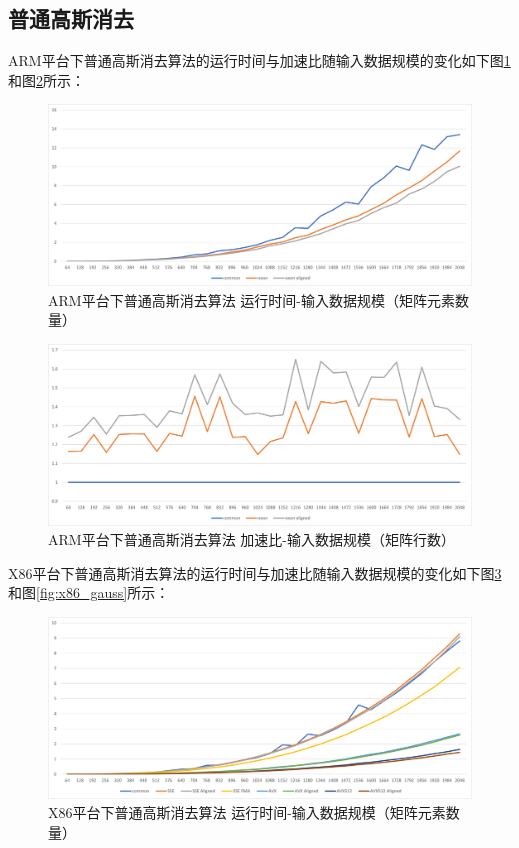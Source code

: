 \documentclass[a4paper]{article}
\begin{document}
\subsection{普通高斯消去}
ARM平台下普通高斯消去算法的运行时间与加速比随输入数据规模的变化如下图\ref{fig:arm_gauss_timing}和图\ref{fig:arm_gauss}所示：
\begin{figure}[H]
    \centering
    \includegraphics[width=6.2in]{fig/arm_gauss_timing.png}
    \caption{ARM平台下普通高斯消去算法 运行时间-输入数据规模（矩阵元素数量）}
    \label{fig:arm_gauss_timing}
\end{figure}

\begin{figure}[H]
    \centering
    \includegraphics[width=6.2in]{fig/arm_gauss.png}
    \caption{ARM平台下普通高斯消去算法 加速比-输入数据规模（矩阵行数）}
    \label{fig:arm_gauss}
\end{figure}

\newpage
X86平台下普通高斯消去算法的运行时间与加速比随输入数据规模的变化如下图\ref{fig:x86_gauss_timing}和图\ref{fig:x86_gauss}所示：

\begin{figure}[H]
    \centering
    \includegraphics[width=6.2in]{fig/x86_gauss_timing.png}
    \caption{X86平台下普通高斯消去算法 运行时间-输入数据规模（矩阵元素数量）}
    \label{fig:x86_gauss_timing}
\end{figure}
\end{document}
